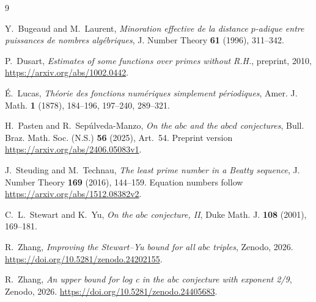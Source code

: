 \begin{thebibliography}{9}

Y.~Bugeaud and M.~Laurent, \emph{Minoration effective de la distance
\(p\)-adique entre puissances de nombres alg\'ebriques}, J. Number Theory
\textbf{61} (1996), 311--342.

P.~Dusart, \emph{Estimates of some functions over primes without R.H.},
preprint, 2010, \url{https://arxiv.org/abs/1002.0442}.

\'E.~Lucas, \emph{Th\'eorie des fonctions num\'eriques simplement
p\'eriodiques}, Amer. J. Math. \textbf{1} (1878), 184--196, 197--240,
289--321.

H.~Pasten and R.~Sep\'ulveda-Manzo, \emph{On the \(abc\) and the
\(abcd\) conjectures}, Bull. Braz. Math. Soc. (N.S.) \textbf{56}
(2025), Art.~54. Preprint version \url{https://arxiv.org/abs/2406.05083v1}.

J.~Steuding and M.~Technau, \emph{The least prime number in a Beatty
sequence}, J. Number Theory \textbf{169} (2016), 144--159.
Equation numbers follow \url{https://arxiv.org/abs/1512.08382v2}.

C.~L.~Stewart and K.~Yu, \emph{On the \(abc\) conjecture, II}, Duke Math. J.
\textbf{108} (2001), 169--181.

R.~Zhang, \emph{Improving the Stewart--Yu bound for all \(abc\) triples},
Zenodo, 2026. \url{https://doi.org/10.5281/zenodo.24202155}.

R.~Zhang, \emph{An upper bound for log c in the abc conjecture with exponent 2/9}, Zenodo, 2026. \url{https://doi.org/10.5281/zenodo.24405683}.
\end{thebibliography}
